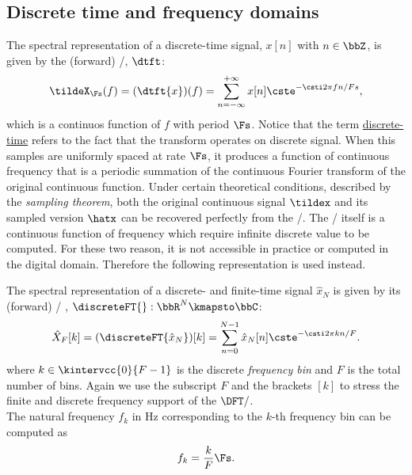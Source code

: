 \subsection{Discrete time and frequency domains}
The spectral representation of a discrete-time signal, $x[n]$ with $n \in \bbZ$, is given by the (forward) \DTFTdef/, $\dtft$:
\begin{equation}\label{eq:processing:dtft}
    \tildeX_{\Fs}(f) = (\dtft{x})(f) =
    \sum_{n = -\infty}^{+\infty}
    x[ n]
    \cste^{-\csti 2 \pi f n / Fs}
    ,
\end{equation}
which is a continuos function of $f$ with period $\Fs$.
Notice that the term \underline{discrete-time} refers to the fact that the transform operates on discrete signal.
When this samples are uniformly spaced at rate $\Fs$, it produces a function of continuous frequency that is a periodic summation of the continuous Fourier transform of the original continuous function.
Under certain theoretical conditions, described by the \textit{sampling theorem}, both the original continuous signal $\tildex$ and its sampled version $\hatx$ can be recovered perfectly from the \DTFT/.
The \DTFT/ itself is a continuous function of frequency which require infinite discrete value to be computed.
For these two reason, it is not accessible in practice or computed in the digital domain.
Therefore the following representation is used instead.

The spectral representation of a discrete- and finite-time signal $\hat{x}_N$ is given by its (forward) \DFTdef/
,
$\discreteFT{}:\bbR^N\kmapsto\bbC$:
\begin{equation}\label{eq:processing:dft}
    \hat{X}_F[ k] = (\discreteFT{\hat{x}_N})[k] =
    \sum_{n = 0}^{N - 1}
    \hat{x}_N[ n]
    \cste^{-\csti2\pi k n / F}
    .
\end{equation}
where $k \in \kintervcc{0}{F - 1}$ is the discrete \textit{frequency bin} and $F$ is the total number of bins.
Again we use the subscript $F$ and the brackets $[k]$ to stress the finite and discrete frequency support of the $\DFT/$.
\\The natural frequency $f_k$ in $\si{\Hz}$ corresponding to the $k$-th frequency bin can be computed as
\begin{equation}\label{eq:processing:fk}
    f_k = \frac{k}{F}\Fs
    .
\end{equation}

